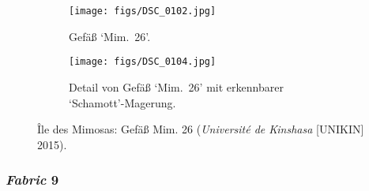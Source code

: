 
\begin{figure*}[!tb]
	\centering
	\begin{subfigure}[t]{.49\textwidth}
		\centering
		\texttt{[image: figs/DSC\_0102.jpg]}
		\caption{Gefäß \enquote*{Mim.~26}.}
		\label{fig:Mimosas_Mim26_kompl}
	\end{subfigure}
	\begin{subfigure}[t]{.49\textwidth}	
		\centering
		\texttt{[image: figs/DSC\_0104.jpg]}
		\caption{Detail von Gefäß \enquote*{Mim.~26} mit erkennbarer \enquote*{Schamott}-Magerung.}
		\label{fig:Mimosas_Mim26_Detail}
	\end{subfigure}
	\caption{Île des Mimosas: Gefäß Mim. 26 (\textit{Université de Kinshasa} [UNIKIN] 2015).}
	\label{fig:Mimosas_Mim26}
\end{figure*}

\subsubsection*{\textit{Fabric} 9}

